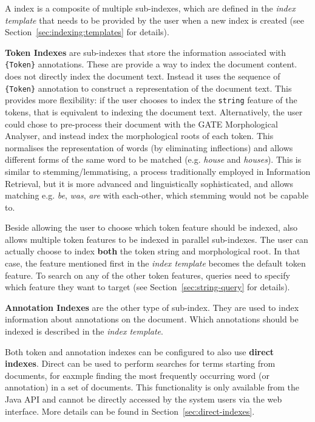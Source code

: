 A \Mimir{} index is a composite of multiple sub-indexes, which are defined in
the {\em index template} that needs to be provided by the user when a new
\Mimir{} index is created (see Section~\ref{sec:indexing:templates} for
details).

{\bf Token Indexes} are sub-indexes that store the information associated with 
\verb!{Token}! annotations. These are provide a way to index the document
content. \Mimir{} does not directly index the document text. Instead it uses the
sequence of \verb!{Token}! annotation to construct a representation of the
document text. This provides more flexibility: if the user chooses to index the
{\tt string} feature of the tokens, that is equivalent to indexing the document
text. Alternatively, the user could chose to pre-process their document with the
GATE Morphological Analyser, and instead index the morphological roots of each
token. This normalises the representation of words (by eliminating inflections)
and allows different forms of the same word to be matched (e.g. {\em house} and
{\em houses}). This is similar to stemming/lemmatising, a process traditionally
employed in Information Retrieval, but it is more advanced and linguistically
sophisticated, and allows matching e.g. {\em be}, {\em was}, {\em are} with
each-other, which stemming would not be capable to.

Beside allowing the user to choose which token feature should be indexed,
\Mimir{} also allows multiple token features to be indexed in parallel
sub-indexes. The user can actually choose to index {\bf both} the token string
and morphological root. In that case, the feature mentioned first in the
{\em index template} becomes the default token feature. To search on any of the
other token features, queries need to specify which feature they want to target
(see Section~\ref{sec:string-query} for details).

{\bf Annotation Indexes} are the other type of \Mimir{} sub-index. They are used
to index information about annotations on the document. Which annotations should
be indexed is described in the {\em index template}.

Both token and annotation indexes can be configured to also use {\bf direct
indexes}. Direct can be used to perform searches for terms starting from
documents, for eaxmple finding the most frequently occurring word (or
annotation) in a set of documents. This functionality is only available from the
Java API and cannot be directly accessed by the system users via the web
interface. More details can be found in Section~\ref{sec:direct-indexes}.

